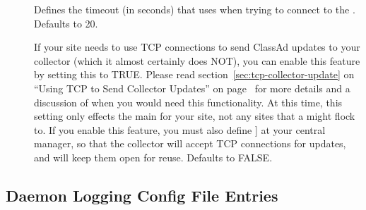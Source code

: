 \begin{description}
\item[] \label{param:QQueryTimeout}
  Defines the timeout (in seconds) that  uses when trying to
  connect to the .  Defaults to 20.

\item[]
  \label{param:UpdateCollectorWithTcp}
  If your site needs to use TCP connections to send ClassAd updates to
  your collector (which it almost certainly does NOT), you can enable
  this feature by setting this to TRUE.
  Please read section~\ref{sec:tcp-collector-update} on ``Using TCP to
  Send Collector Updates'' on page~\pageref{sec:tcp-collector-update}
  for more details and a discussion of when you would need this
  functionality. 
  At this time, this setting only effects the main 
  for your site, not any sites that a  might flock to. 
  If you enable this feature, you must also define
  ] at your central manager, so
  that the collector will accept TCP connections for updates, and will
  keep them open for reuse.
  Defaults to FALSE.

\end{description}


\subsection{\label{sec:Daemon-Logging-Config-File-Entries}
Daemon Logging Config File Entries}

